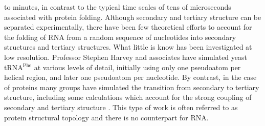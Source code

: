 to minutes, in contrast to the typical time scales of tens of
microseconds associated with protein folding.
Although secondary and tertiary structure can be separated
experimentally, there have been few theoretical efforts to account
for the folding of RNA from a random sequence of nucleotides into
secondary structures and tertiary structures. What little is know
has been investigated at low resolution. Professor Stephen Harvey
and associates have simulated yeast tRNA$^{\textrm{Phe}}$
\cite{malhotra1990, stagg2003} at various levels of detail, initially using
only one pseudoatom per helical region, and later one pseudoatom per
nucleotide.
By contrast, in the case of proteins many groups have simulated the
transition from secondary to tertiary structure, including some
calculations which account for the strong coupling of secondary and
tertiary structure \cite{westhead1999, gerstein2003, meiler2003}.
This type of work is often referred to as protein structural
topology and there is no counterpart for RNA.


